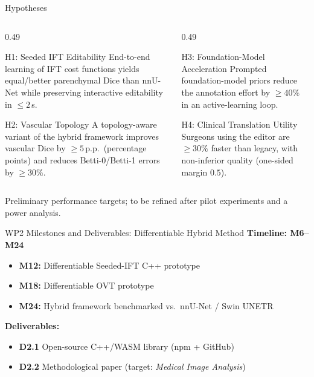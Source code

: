\documentclass[aspectratio=169,11pt,xcolor=table]{beamer}
\begin{document}
\begin{frame}{Hypotheses}
\scriptsize
\begin{columns}[T]
\begin{column}{0.49\linewidth}
\begin{block}{H1: Seeded IFT Editability}
\scriptsize
End-to-end learning of IFT cost functions yields equal/better parenchymal Dice than nnU-Net while preserving interactive editability in $\le 2$\,s.
\end{block}
\vspace{0.1cm}
\begin{block}{H2: Vascular Topology}
\scriptsize
A topology-aware variant of the hybrid framework improves vascular Dice by $\ge 5$\,p.p.\ (percentage points) and reduces Betti-0/Betti-1 errors by $\ge 30\%$.
\end{block}
\end{column}
\begin{column}{0.49\linewidth}
\begin{block}{H3: Foundation-Model Acceleration}
\scriptsize
Prompted foundation-model priors reduce the annotation effort by $\ge 40\%$ in an active-learning loop.
\end{block}
\vspace{0.1cm}
\begin{block}{H4: Clinical Translation Utility}
\scriptsize
Surgeons using the editor are $\ge 30\%$ faster than legacy, with non-inferior quality (one-sided margin $0.5$).
\end{block}
\end{column}
\end{columns}
\vspace{0.1cm}\scriptsize\color{gray}Preliminary performance targets; to be refined after pilot experiments and a power analysis.
\end{frame}

\begin{frame}{WP2 Milestones and Deliverables: Differentiable Hybrid Method}
\footnotesize
\vspace{0.1cm}
\textbf{Timeline: M6--M24}
\vspace{0.1cm}
\begin{itemize}
\setlength\itemsep{6pt}
\item \textbf{M12:} Differentiable Seeded-IFT C++ prototype
\item \textbf{M18:} Differentiable OVT prototype
\item \textbf{M24:} Hybrid framework benchmarked vs.\ nnU-Net / Swin UNETR
\end{itemize}
\vspace{0.15cm}
\textbf{Deliverables:}
\begin{itemize}
\setlength\itemsep{4pt}
\item \textbf{D2.1} Open-source C++/WASM library (npm + GitHub)
\item \textbf{D2.2} Methodological paper (target: \textit{Medical Image Analysis})
\end{itemize}
\end{frame}
\end{document}
